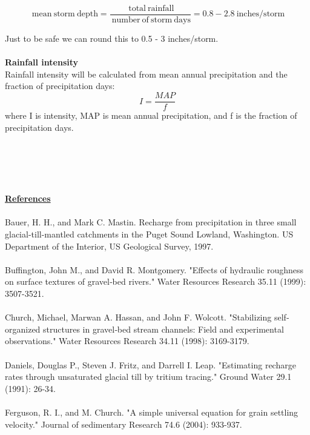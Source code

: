 \documentclass[12pt]{article}
\begin{document}
{\begin{equation}
\mathrm{\ mean \ storm \ depth} =  \frac{\mathrm{\ total \ rainfall}}{\mathrm{\ number \ of \ storm \ days}} = 0.8 - 2.8 \mathrm{\ inches/storm}
\end{equation}

\noindent
Just to be safe we can round this to 0.5 - 3 inches/storm. 
\\
\\
\noindent
{\textbf{Rainfall intensity}}
\\
Rainfall intensity will be calculated from mean annual precipitation and the fraction of precipitation days:
\begin{equation}
I = \frac{MAP}{f}
\end{equation}
where I is intensity, MAP is mean annual precipitation, and f is the fraction of precipitation days. 
\\
\\
\\
\\
\\
\\
\noindent
{\textbf{\Large{\underline{References}}}}
\\
\\
\noindent
Bauer, H. H., and Mark C. Mastin. Recharge from precipitation in three small glacial-till-mantled catchments in the Puget Sound Lowland, Washington. US Department of the Interior, US Geological Survey, 1997.
\\
\\
\noindent
Buffington, John M., and David R. Montgomery. "Effects of hydraulic roughness on surface textures of gravel‐bed rivers." Water Resources Research 35.11 (1999): 3507-3521.
\\
\\
\noindent
Church, Michael, Marwan A. Hassan, and John F. Wolcott. "Stabilizing self‐organized structures in gravel‐bed stream channels: Field and experimental observations." Water Resources Research 34.11 (1998): 3169-3179.
\\
\\
\noindent
Daniels, Douglas P., Steven J. Fritz, and Darrell I. Leap. "Estimating recharge rates through unsaturated glacial till by tritium tracing." Ground Water 29.1 (1991): 26-34.
\\
\\
\noindent
Ferguson, R. I., and M. Church. "A simple universal equation for grain settling velocity." Journal of sedimentary Research 74.6 (2004): 933-937.
\\
}
\end{document}
